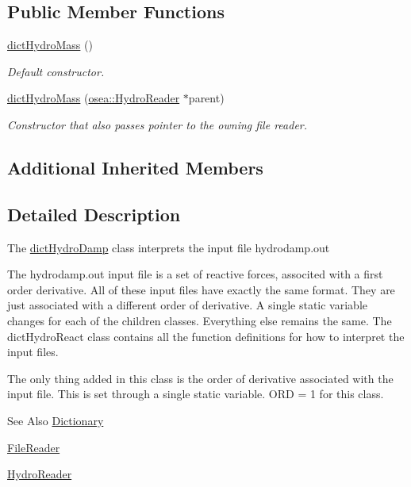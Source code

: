\subsection*{Public Member Functions}
\begin{DoxyCompactItemize}
\item 
\hyperlink{classosea_1_1dict_hydro_mass_aa76053411e24aee807ddfeb943028aa7}{dict\-Hydro\-Mass} ()
\begin{DoxyCompactList}\small\item\em Default constructor. \end{DoxyCompactList}\item 
\hyperlink{classosea_1_1dict_hydro_mass_a3e774b2790b8793f4cde10a61c58c3a8}{dict\-Hydro\-Mass} (\hyperlink{classosea_1_1_hydro_reader}{osea\-::\-Hydro\-Reader} $\ast$parent)
\begin{DoxyCompactList}\small\item\em Constructor that also passes pointer to the owning file reader. \end{DoxyCompactList}\end{DoxyCompactItemize}
\subsection*{Additional Inherited Members}


\subsection{Detailed Description}
The \hyperlink{classosea_1_1dict_hydro_damp}{dict\-Hydro\-Damp} class interprets the input file hydrodamp.\-out

The hydrodamp.\-out input file is a set of reactive forces, associted with a first order derivative. All of these input files have exactly the same format. They are just associated with a different order of derivative. A single static variable changes for each of the children classes. Everything else remains the same. The dict\-Hydro\-React class contains all the function definitions for how to interpret the input files.

The only thing added in this class is the order of derivative associated with the input file. This is set through a single static variable. O\-R\-D = 1 for this class.

\begin{DoxySeeAlso}{See Also}
\hyperlink{classosea_1_1_dictionary}{Dictionary} 

\hyperlink{classosea_1_1_file_reader}{File\-Reader} 

\hyperlink{classosea_1_1_hydro_reader}{Hydro\-Reader} 
\end{DoxySeeAlso}


